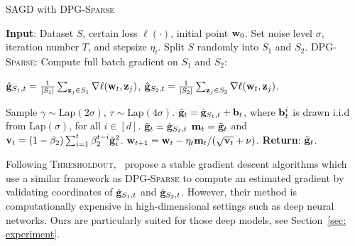 \documentclass[11pt]{article}
\begin{document}
\begin{algorithm}[H]
\caption{\textsc{SAGD} with \textsc{DPG-Sparse}}
\begin{algorithmic}[1]
\label{algo: sparse}
\STATE \textbf{Input}: Dataset $S$,  certain loss $\ell(\cdot)$, initial point $\mathbf{w}_0$.
\STATE Set  noise level $\sigma$, iteration number $T$,  and stepsize $\eta_t$.
\STATE Split $S$ randomly into $S_1$ and $S_2$. 
\STATE   \textsc{DPG-Sparse:} Compute full batch gradient on $S_1$ and $S_2$:\\
\centerline{$\hat {\mathbf{g}}_{S_1,t} = \frac{1}{|S_1|} \sum_{\mathbf{z}_j \in S_1}\nabla \ell(\mathbf{w}_t, \mathbf{z}_j)$,%
\hspace{0.2in}
$\hat {\mathbf{g}}_{S_2,t} = \frac{1}{|S_2|} \sum_{\mathbf{z}_j \in S_2}\nabla \ell(\mathbf{w}_t, \mathbf{z}_j)$.}
\STATE Sample $\gamma \sim \text{Lap}(2\sigma)$, $\tau \sim \text{Lap}(4\sigma)$.
\STATE  $\tilde {\mathbf{g}}_t = \hat {\mathbf{g}}_{S_1,t} + \mathbf{b}_t$, where $\mathbf{b}_t^i$ is drawn i.i.d from Lap$(\sigma)$, for all $ i \in [d]$.
\ELSE \STATE $\tilde {\mathbf{g}}_t = \hat {\mathbf{g}}_{S_2,t}$
\ENDIF
\STATE 
$\mathbf{m}_t = \tilde {\mathbf{g}}_t$ and $\mathbf{v}_t = \left(1-\beta_{2}\right) \sum_{i=1}^{t} \beta_{2}^{t-i} \tilde {\mathbf{g}}_{i}^{2}$.
\STATE $\mathbf{w}_{t+1}=\mathbf{w}_{t}-\eta_t \mathbf{m}_t /(\sqrt{\mathbf{v}_t}+\nu)$.
\ENDFOR 
\STATE \textbf{Return}: $\tilde {\mathbf{g}}_t$.
\end{algorithmic}
\end{algorithm}\vspace{-0.1in}


Following \textsc{Thresholdout},~\citet{zhch2018} propose a stable gradient descent algorithms which use a similar framework as \textsc{DPG-Sparse} to compute an estimated gradient by validating coordinates of $\hat {\mathbf{g}}_{S_1,t}$ and $\hat {\mathbf{g}}_{S_2,t}$. 
However, their method is computationally expensive in high-dimensional settings such as deep neural networks. Ours are particularly suited for those deep models, see Section~\ref{sec: experiment}.
\end{document}
